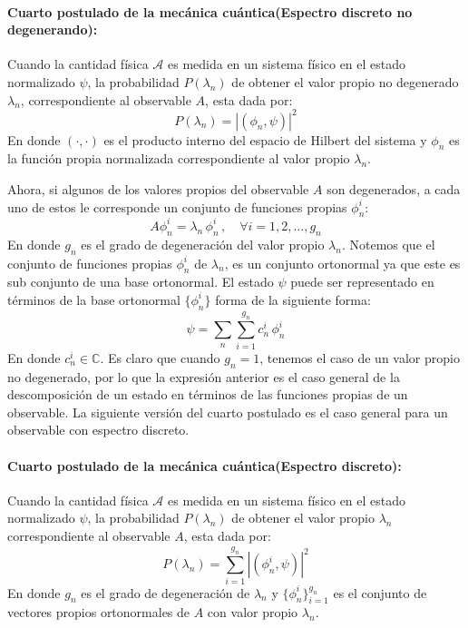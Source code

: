 \documentclass[12pt]{book}
\numberwithin{equation}{chapter}
\def\C{\mathbb{C}}
\begin{document}
\paragraph{Cuarto postulado de la mec\'anica cu\'antica(Espectro discreto no degenerando):} Cuando la cantidad f\'isica $\mathcal{A}$ es medida en un sistema f\'isico en el estado normalizado $\psi$, la probabilidad $P(\lambda_{n})$ de obtener el valor propio no degenerado $\lambda_{n}$, correspondiente al observable $A$, esta dada por:
\begin{equation}
P(\lambda_{n})= \left| ( \phi_{n},\psi ) \right|^{2}
\end{equation}
En donde $ ( \cdot , \cdot ) $ es el producto interno del espacio de Hilbert del sistema y $ \phi_{n} $ es la funci\'on propia normalizada correspondiente al valor propio $\lambda_{n}$.\\
\rightline{$\dag$}
\vspace{3 mm}

Ahora, si algunos de los valores propios del observable $A$ son degenerados, a cada uno de estos le corresponde un conjunto de funciones propias $ \phi_{n}^{i} $:
$$ A \phi_{n}^{i} = \lambda_{n}\, \phi_{n}^{i} \,,\,\,\,\,\,\, \forall i=1,2,...,g_{n} $$
En donde $g_{n}$ es el grado de degeneraci\'on del valor propio $\lambda_{n}$. Notemos que el conjunto de funciones propias $\phi_{n}^{i}$ de $\lambda_{n}$, es un conjunto ortonormal ya que este es sub conjunto de una base ortonormal. El estado $\psi$ puede ser representado en t\'erminos de la base ortonormal $\{ \phi_{n}^{i} \}$ forma de la siguiente forma:
$$ \psi = \sum_{n} \sum_{i=1}^{g_{n}} c_{n}^{i}\, \phi_{n}^{i} $$
En donde $c_{n}^{i} \in \C$.
Es claro que cuando $g_{n}=1$, tenemos el caso de un valor propio no degenerado, por lo que la expresi\'on anterior es el caso general de la descomposici\'on de un estado en t\'erminos de las funciones propias de un observable. La siguiente versi\'on del cuarto postulado es el caso general para un observable con espectro discreto.
 
\paragraph{Cuarto postulado de la mec\'anica cu\'antica(Espectro discreto):}
Cuando la cantidad f\'isica $\mathcal{A}$ es medida en un sistema f\'isico en el estado normalizado $\psi$, la probabilidad $P(\lambda_{n})$ de obtener el valor propio $\lambda_{n}$ correspondiente al observable $A$, esta dada por:
\begin{equation}
P(\lambda_{n})= \sum_{i=1}^{g_{n}} \left| ( \phi_{n}^{i},\psi ) \right|^{2}
\end{equation}
En donde $g_{n}$ es el grado de degeneraci\'on de $\lambda_{n}$ y $\{ \phi_{n}^{i} \}_{i=1}^{g_{n}}$ es el conjunto de vectores propios ortonormales de $A$ con valor propio $\lambda_{n}$.\\
\rightline{$\dag$}
\vspace{3 mm}
\end{document}
